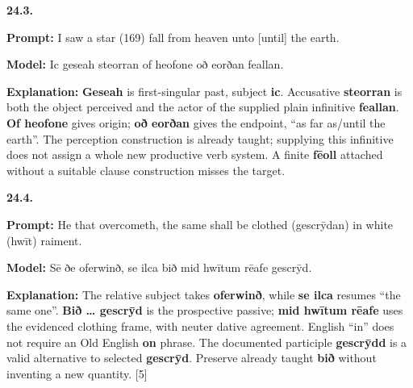 \par\begin{minipage}{\linewidth}\raggedright
\textbf{24.3.}

\textbf{Prompt:} I saw a star (169) fall from heaven unto [until] the earth.

\textbf{Model:} Ic geseah steorran of heofone oð eorðan feallan.

\textbf{Explanation:} \textbf{Geseah} is first-singular past, subject \textbf{ic}. Accusative \textbf{steorran} is both the object perceived and the actor of the supplied plain infinitive \textbf{feallan}. \textbf{Of heofone} gives origin; \textbf{oð eorðan} gives the endpoint, “as far as/\allowbreak{}until the earth”. The perception construction is already taught; supplying this infinitive does not assign a whole new productive verb system. A finite \textbf{fēoll} attached without a suitable clause construction misses the target.

\end{minipage}\par\addvspace{4pt}

\par\begin{minipage}{\linewidth}\raggedright
\textbf{24.4.}

\textbf{Prompt:} He that overcometh, the same shall be clothed (gescrȳdan) in white (hwīt) raiment.

\textbf{Model:} Sē ðe oferwinð, se ilca bið mid hwītum rēafe gescrȳd.

\textbf{Explanation:} The relative subject takes \textbf{oferwinð}, while \textbf{se ilca} resumes “the same one”. \textbf{Bið … gescrȳd} is the prospective passive; \textbf{mid hwītum rēafe} uses the evidenced clothing frame, with neuter dative agreement. English “in” does not require an Old English \textbf{on} phrase. The documented participle \textbf{gescrȳdd} is a valid alternative to selected \textbf{gescrȳd}. Preserve already taught \textbf{bið} without inventing a new quantity. [5]

\end{minipage}\par\addvspace{4pt}

